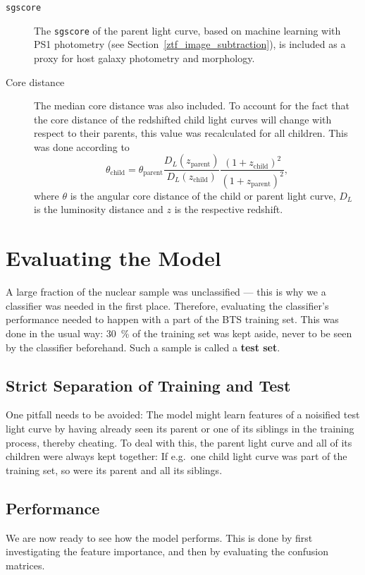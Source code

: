 \begin{description}
  \item[\texttt{sgscore}] The \texttt{sgscore} of the parent light curve, based on machine learning with PS1 photometry (see Section~\ref{ztf_image_subtraction}), is included as a proxy for host galaxy photometry and morphology.
  \item[Core distance] The median core distance was also included. To account for the fact that the core distance of the redshifted child light curves will change with respect to their parents, this value was recalculated for all children. This was done according to
    \begin{equation}
      \theta_\text{child} = \theta_\text{parent} \frac{D_L(z_\text{parent})}{D_L(z_\text{child})} \frac{(1+z_\text{child})^2}{(1+z_\text{parent})^2},
    \end{equation}
    where $\theta$ is the angular core distance of the child or parent light curve, $D_L$ is the luminosity distance and $z$ is the respective redshift.
\end{description}

\section{Evaluating the Model}
A large fraction of the nuclear sample was unclassified --- this is why we a classifier was needed in the first place. Therefore, evaluating the classifier's performance needed to happen with a part of the BTS training set. This was done in the usual way: \SI{30}{\percent} of the training set was kept aside, never to be seen by the classifier beforehand. Such a sample is called a \textbf{test set}.

\subsection{Strict Separation of Training and Test}
One pitfall needs to be avoided: The model might learn features of a noisified test light curve by having already seen its parent or one of its siblings in the training process, thereby cheating. To deal with this, the parent light curve and all of its children were always kept together: If e.g.~one child light curve was part of the training set, so were its parent and all its siblings.

\subsection{Performance}
We are now ready to see how the model performs. This is done by first investigating the feature importance, and then by evaluating the confusion matrices.

